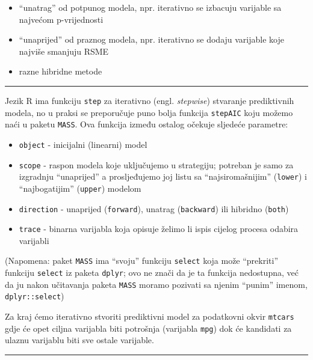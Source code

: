 \documentclass[]{book}
\providecommand{\tightlist}{%
  \setlength{\itemsep}{0pt}\setlength{\parskip}{0pt}}
\theoremstyle{definition}
\theoremstyle{definition}
\theoremstyle{definition}
\theoremstyle{remark}
\begin{document}
\begin{itemize}
\tightlist
\item
  ``unatrag'' od potpunog modela, npr. iterativno se izbacuju varijable
  sa najvećom p-vrijednosti
\item
  ``unaprijed'' od praznog modela, npr. iterativno se dodaju varijable
  koje najviše smanjuju RSME
\item
  razne hibridne metode
\end{itemize}

\begin{center}\rule{0.5\linewidth}{\linethickness}\end{center}

Jezik R ima funkciju \texttt{step} za iterativno (engl. \emph{stepwise})
stvaranje prediktivnih modela, no u praksi se preporučuje puno bolja
funkcija \texttt{stepAIC} koju možemo naći u paketu \texttt{MASS}. Ova
funkcija između ostalog očekuje sljedeće parametre:

\begin{itemize}
\tightlist
\item
  \texttt{object} - inicijalni (linearni) model
\item
  \texttt{scope} - raspon modela koje uključujemo u strategiju; potreban
  je samo za izgradnju ``unaprijed'' a prosljeđujemo joj listu sa
  ``najsiromašnijim'' (\texttt{lower}) i ``najbogatijim''
  (\texttt{upper}) modelom
\item
  \texttt{direction} - unaprijed (\texttt{forward}), unatrag
  (\texttt{backward}) ili hibridno (\texttt{both})
\item
  \texttt{trace} - binarna varijabla koja opisuje želimo li ispis
  cijelog procesa odabira varijabli
\end{itemize}

(Napomena: paket \texttt{MASS} ima ``svoju'' funkciju \texttt{select}
koja može ``prekriti'' funkciju \texttt{select} iz paketa
\texttt{dplyr}; ovo ne znači da je ta funkcija nedostupna, već da ju
nakon učitavanja paketa \texttt{MASS} moramo pozivati sa njenim
``punim'' imenom, \texttt{dplyr::select})

Za kraj ćemo iterativno stvoriti prediktivni model za podatkovni okvir
\texttt{mtcars} gdje će opet ciljna varijabla biti potrošnja (varijabla
\texttt{mpg}) dok će kandidati za ulaznu varijablu biti sve ostale
varijable.

\begin{center}\rule{0.5\linewidth}{\linethickness}\end{center}
\end{document}
